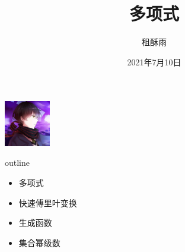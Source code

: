 \documentclass{beamer}
\title{多项式}
\author{租酥雨}
\date{2021年7月10日}
\begin{document}
\small
	\begin{frame}
	\titlepage
		\begin{center}		\includegraphics[width=2.0cm]{zsy.jpg}
		\end{center}
	\end{frame}
\begin{frame}{outline}
	\begin{itemize}
		\item 多项式
		\item 快速傅里叶变换
		\item 生成函数
		\item 集合幂级数
	\end{itemize}
\end{frame}
\end{document}
